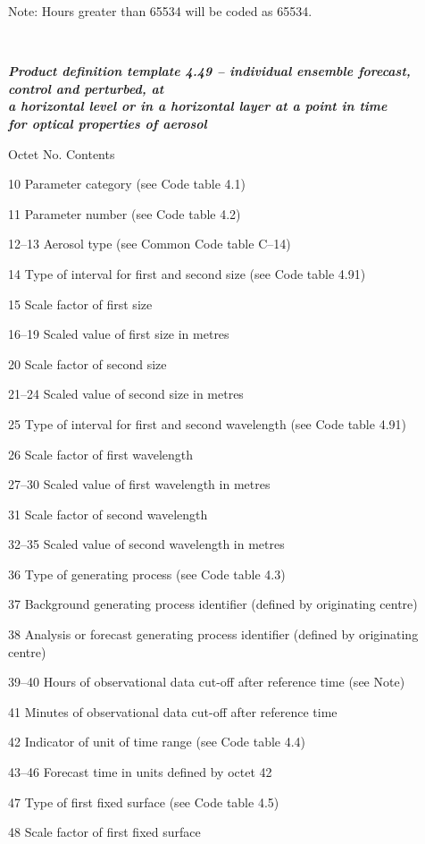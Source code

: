 Note: Hours greater than 65534 will be coded as 65534.

\emph{\textbf{\\
}}

\emph{\textbf{Product definition template 4.49 -- individual ensemble forecast, control and perturbed, at\\
a horizontal level or in a horizontal layer at a point in time\\
for optical properties of aerosol}}

Octet No. Contents

10 Parameter category (see Code table 4.1)

11 Parameter number (see Code table 4.2)

12--13 Aerosol type (see Common Code table C--14)

14 Type of interval for first and second size (see Code table 4.91)

15 Scale factor of first size

16--19 Scaled value of first size in metres

20 Scale factor of second size

21--24 Scaled value of second size in metres

25 Type of interval for first and second wavelength (see Code table 4.91)

26 Scale factor of first wavelength

27--30 Scaled value of first wavelength in metres

31 Scale factor of second wavelength

32--35 Scaled value of second wavelength in metres

36 Type of generating process (see Code table 4.3)

37 Background generating process identifier (defined by originating centre)

38 Analysis or forecast generating process identifier (defined by originating centre)

39--40 Hours of observational data cut-off after reference time (see Note)

41 Minutes of observational data cut-off after reference time

42 Indicator of unit of time range (see Code table 4.4)

43--46 Forecast time in units defined by octet 42

47 Type of first fixed surface (see Code table 4.5)

48 Scale factor of first fixed surface


